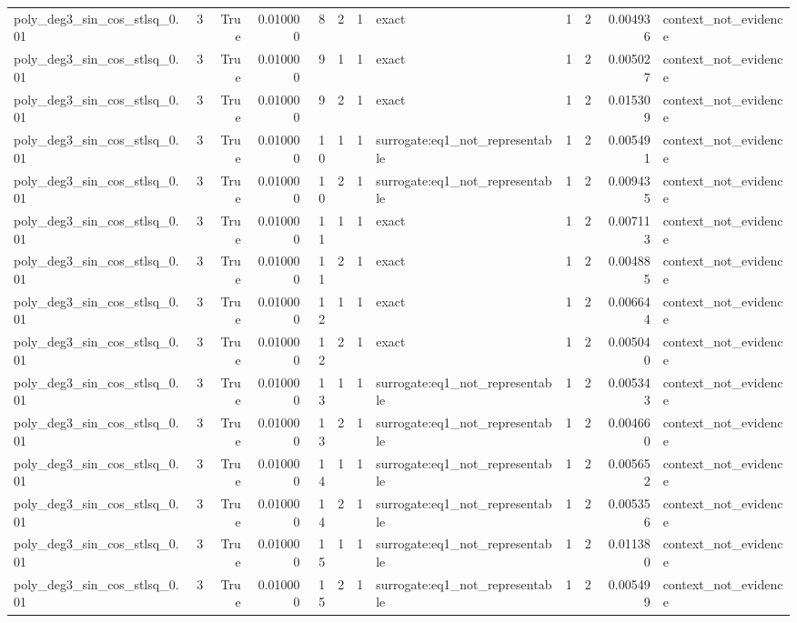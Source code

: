 \begin{tabular}{lrrrrrrlrrrl}
poly\_deg3\_sin\_cos\_stlsq\_0.01 & 3 & True & 0.010000 & 8 & 2 & 1 & exact & 1 & 2 & 0.004936 & context\_not\_evidence \\
poly\_deg3\_sin\_cos\_stlsq\_0.01 & 3 & True & 0.010000 & 9 & 1 & 1 & exact & 1 & 2 & 0.005027 & context\_not\_evidence \\
poly\_deg3\_sin\_cos\_stlsq\_0.01 & 3 & True & 0.010000 & 9 & 2 & 1 & exact & 1 & 2 & 0.015309 & context\_not\_evidence \\
poly\_deg3\_sin\_cos\_stlsq\_0.01 & 3 & True & 0.010000 & 10 & 1 & 1 & surrogate:eq1\_not\_representable & 1 & 2 & 0.005491 & context\_not\_evidence \\
poly\_deg3\_sin\_cos\_stlsq\_0.01 & 3 & True & 0.010000 & 10 & 2 & 1 & surrogate:eq1\_not\_representable & 1 & 2 & 0.009435 & context\_not\_evidence \\
poly\_deg3\_sin\_cos\_stlsq\_0.01 & 3 & True & 0.010000 & 11 & 1 & 1 & exact & 1 & 2 & 0.007113 & context\_not\_evidence \\
poly\_deg3\_sin\_cos\_stlsq\_0.01 & 3 & True & 0.010000 & 11 & 2 & 1 & exact & 1 & 2 & 0.004885 & context\_not\_evidence \\
poly\_deg3\_sin\_cos\_stlsq\_0.01 & 3 & True & 0.010000 & 12 & 1 & 1 & exact & 1 & 2 & 0.006644 & context\_not\_evidence \\
poly\_deg3\_sin\_cos\_stlsq\_0.01 & 3 & True & 0.010000 & 12 & 2 & 1 & exact & 1 & 2 & 0.005040 & context\_not\_evidence \\
poly\_deg3\_sin\_cos\_stlsq\_0.01 & 3 & True & 0.010000 & 13 & 1 & 1 & surrogate:eq1\_not\_representable & 1 & 2 & 0.005343 & context\_not\_evidence \\
poly\_deg3\_sin\_cos\_stlsq\_0.01 & 3 & True & 0.010000 & 13 & 2 & 1 & surrogate:eq1\_not\_representable & 1 & 2 & 0.004660 & context\_not\_evidence \\
poly\_deg3\_sin\_cos\_stlsq\_0.01 & 3 & True & 0.010000 & 14 & 1 & 1 & surrogate:eq1\_not\_representable & 1 & 2 & 0.005652 & context\_not\_evidence \\
poly\_deg3\_sin\_cos\_stlsq\_0.01 & 3 & True & 0.010000 & 14 & 2 & 1 & surrogate:eq1\_not\_representable & 1 & 2 & 0.005356 & context\_not\_evidence \\
poly\_deg3\_sin\_cos\_stlsq\_0.01 & 3 & True & 0.010000 & 15 & 1 & 1 & surrogate:eq1\_not\_representable & 1 & 2 & 0.011380 & context\_not\_evidence \\
poly\_deg3\_sin\_cos\_stlsq\_0.01 & 3 & True & 0.010000 & 15 & 2 & 1 & surrogate:eq1\_not\_representable & 1 & 2 & 0.005499 & context\_not\_evidence \\

\end{tabular}

